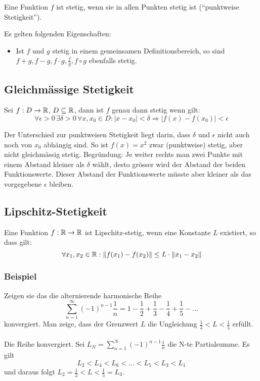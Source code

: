 Eine Funktion $f$ ist stetig, wenn sie in allen Punkten stetig ist
(``punktweise Stetigkeit'').

Es gelten folgenden Eigenschaften:
\begin{itemize}
	\item Ist $f$ und $g$ stetig in einem gemeinsamen Definitionsbereich, so sind
	$f + g, f- g, f \cdot g, \frac{f}{g}, f \circ g$ ebenfalls stetig.
\end{itemize}

\subsection{Gleichmässige Stetigkeit}
Sei $f: D \to \mathbb{R}$, $D \subseteq \mathbb{R}$, dann ist $f$ genau dann stetig wenn gilt:
\[
\forall \epsilon > 0 \, \exists \delta > 0 \, \forall x,x_0 \in D: |x - x_0| < \delta
\Rightarrow |f(x) - f(x_0)| < \epsilon
\]

Der Unterschied zur punktweisen Stetigkeit liegt darin, dass $\delta$ und
$\epsilon$ nicht auch noch von $x_0$ abhängig sind. So ist $f(x) = x^2$ zwar
(punktweise) stetig, aber nicht gleichmässig stetig. Begründung: Je weiter
rechts man zwei Punkte mit einem Abstand kleiner als $\delta$ wählt, desto
grösser wird der Abstand der beiden Funktionswerte. Dieser Abstand der
Funktionswerte müsste aber kleiner als das vorgegebene $\epsilon$ bleiben.

\subsection{Lipschitz-Stetigkeit}
Eine Funktion $f: \mathbb{R} \to \mathbb{R}$ ist Lipschitz-stetig, wenn eine Konstante $L$
existiert, so dass gilt:
\[
\forall x_1,x_2 \in \mathbb{R}: \|f(x_1) - f(x_2)\| \leq L \cdot \|x_1 - x_2\|
\]

\subsubsection{Beispiel}
Zeigen sie das die alternierende harmonische Reihe \[
\sum_{n=1}^\infty (-1)^{n-1} \frac{1}{n} = 1 - \frac{1}{2} +\frac{1}{3} - \frac{1}{4} + \frac{1}{5} - ...
\]
konvergiert. Man zeige, dass der Grenzwert $L$ die Ungleichung $ \frac{1}{2} < L < \frac{1}{5}$ erfüllt.\\
\\
Die Reihe konvergiert. Sei $L_N = \sum_{n=1}^N (-1)^{n-1} \frac{1}{n}$ die N-te Partialsumme. Es gilt \[
L_2 < L_4 < L_6 < ... < L_5 < L_3 < L_1
\] und daraus folgt $L_2 = \frac{1}{2} < L < \frac{1}{5} = L_3$.


